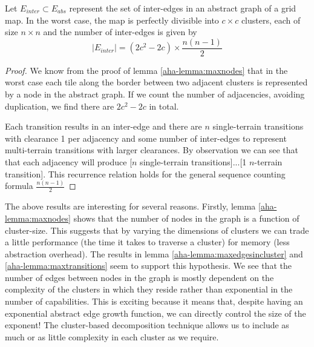\begin{lemma}
\label{aha-lemma:maxtransitions}
Let $E_{inter} \subset E_{abs}$ represent the set of inter-edges in an abstract graph of a grid map. In the worst case, the map is perfectly divisible into $c \times c$ clusters, each of size $n \times n$ and the number of inter-edges is given by 
$$|E_{inter}| = (2c^2 - 2c)\times \frac{n(n-1)}{2}$$
\end{lemma}

\begin{proof}
We know from the proof of lemma \ref{aha-lemma:maxnodes} that in the worst case each tile along the border between two adjacent clusters is represented by a node in the abstract graph. 
If we count the number of adjacencies, avoiding duplication, we find there are $2c^2 - 2c$ in total.
\par \indent
Each transition results in an inter-edge and there are $n$ single-terrain transitions with clearance 1 per adjacency and some number of inter-edges to represent multi-terrain transitions with larger clearances. 
By observation we can see that that each adjacency will produce [$n$ single-terrain transitions]...[1 $n$-terrain transition]. 
This recurrence relation holds for the general sequence counting formula $\frac{n(n-1)}{2}$
\end{proof}

The above results are interesting for several reasons. 
Firstly, lemma \ref{aha-lemma:maxnodes} shows that the number of nodes in the graph is a function of cluster-size. This suggests that by varying the dimensions of clusters we can trade a little performance (the time it takes to traverse a cluster) for memory (less abstraction overhead).
The results in lemma \ref{aha-lemma:maxedgesincluster} and \ref{aha-lemma:maxtransitions} seem to support this hypothesis. 
We see that the number of edges between nodes in the graph is mostly dependent on the complexity of the clusters in which they reside rather than exponential in the number of capabilities. 
This is exciting because it means that, despite having an exponential abstract edge growth function, we can directly control the size of the exponent! 
The cluster-based decomposition technique allows us to include as much or as little complexity in each cluster as we require.
